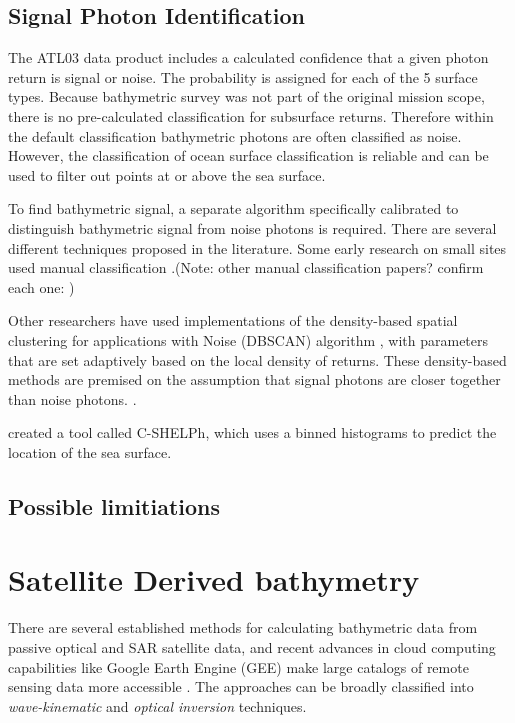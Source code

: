 \subsection{Signal Photon Identification}
\label{subsec:denoising}
The ATL03 data product includes a calculated confidence that a given photon return is signal or noise. The probability is assigned for each of the 5 surface types. Because bathymetric survey was not part of the original mission scope, there is no pre-calculated classification for subsurface returns. Therefore within the default classification bathymetric photons are often classified as noise. However, the classification of ocean surface classification is reliable \parencite{}  and can be used to filter out points at or above the sea surface.

To find bathymetric signal, a separate algorithm specifically calibrated to distinguish bathymetric signal from noise photons is required. There are several different techniques proposed in the literature. Some early research on small sites used manual classification \parencite{Forfinski-Sarkozi2016}.(Note: other manual classification papers? confirm each one:
\cite{Thomas2021d}
\cite{Babbel2021a}
\cite{Albright2021})

Other researchers have used implementations of the density-based spatial clustering for applications with Noise (DBSCAN) algorithm \parencite{Ester1996}, with parameters that are set adaptively based on the local density of returns. These density-based methods are premised on the assumption that signal photons are closer together than noise photons. \parencite{Neuenschwander2019}.

\citeauthor{Thomas2022} created a tool called C-SHELPh, which uses a binned histograms to predict the location of the sea surface.

\subsection{Possible limitiations}

\section{Satellite Derived bathymetry}
There are several established methods for calculating bathymetric data from passive optical and SAR satellite data, and recent advances in cloud computing capabilities like Google Earth Engine (GEE) \parencite{Gorelick2017a} make large catalogs of remote sensing data more accessible \parencite{Pike2019,Turner2021}. The approaches can be broadly classified into \emph{wave-kinematic} and \emph{optical inversion} techniques.

